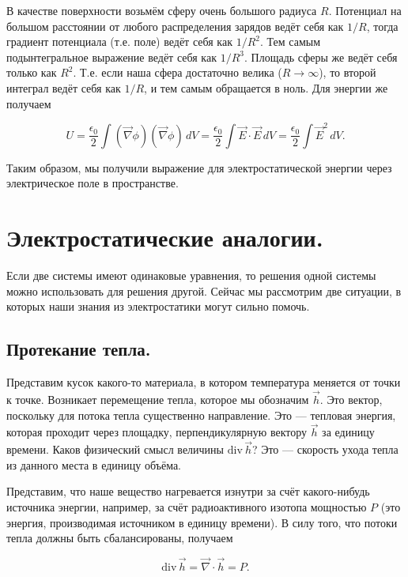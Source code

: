 \documentclass[11pt,a4paper]{article}
\numberwithin{equation}{section}
\renewcommand{\div}{\mathrm{div}\,}
\newcommand{\vn}{\vec{\nabla}}
\newcommand{\eps}{\epsilon}
\begin{document}
В качестве поверхности возьмём сферу очень
большого радиуса $R$. Потенциал на большом расстоянии от любого
распределения зарядов ведёт себя как $1/R$, тогда градиент потенциала
(т.е. поле) ведёт себя как $1/R^2$. Тем самым подынтегральное
выражение ведёт себя как $1/R^3$. Площадь сферы же ведёт себя только
как $R^2$. Т.е. если наша сфера достаточно велика ($R \to \infty$), то
второй интеграл ведёт себя как $1/R$, и тем самым обращается в
ноль. Для энергии же получаем

\begin{equation}
  \label{eq:energy_field_der_5}
  U = \frac{\eps_0}{2} \int (\vn \phi) (\vn \phi) \, dV =
  \frac{\eps_0}{2} \int \vec{E} \cdot \vec{E} \, dV = \frac{\eps_0}{2}
  \int \vec{E}^2 \, dV.
\end{equation}

Таким образом, мы получили выражение для электростатической энергии
через электрическое поле в пространстве. 

\section{Электростатические аналогии. }
\label{sec:es_analogs}

Если две системы имеют одинаковые уравнения, то решения одной
системы можно использовать для решения другой. Сейчас мы рассмотрим
две ситуации, в которых наши знания из электростатики могут сильно
помочь. 

\subsection{Протекание тепла.}
\label{sec:heat}

Представим кусок какого-то материала, в котором температура меняется
от точки к точке. Возникает перемещение тепла, которое мы обозначим
$\vec{h}$. Это вектор, поскольку для потока тепла существенно
направление. Это --- тепловая энергия, которая проходит через
площадку, перпендикулярную вектору $\vec{h}$ за единицу времени. Каков
физический смысл величины $\div \vec{h}$? Это --- скорость ухода тепла
из данного места в единицу объёма. 

Представим, что наше вещество нагревается изнутри за счёт
какого-нибудь источника энергии, например, за счёт радиоактивного
изотопа мощностью $P$ (это энергия, производимая источником в единицу
времени). В силу того, что потоки тепла должны быть сбалансированы,
получаем 

\begin{equation}
  \label{eq:heat_1}
  \div \vec{h} = \vn \cdot \vec{h} = P.
\end{equation}
\end{document}
